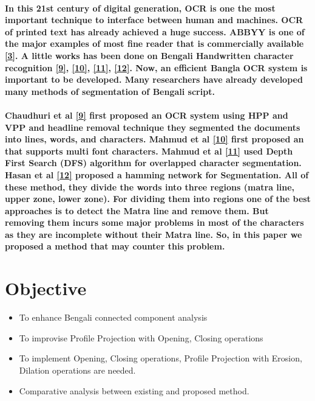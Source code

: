 \documentclass[a4paper,12pt]{article}
\begin{document}
\paragraph*{In this 21st century of digital generation, OCR is one the most important technique to interface between human and machines. OCR of printed text has already achieved a huge success. ABBYY is one of the major examples of most fine reader that is commercially available \hyperlink{3}{[3]}. A little works has been done on Bengali Handwritten character recognition \hyperlink{9}{[9]}, \hyperlink{10}{[10]}, \hyperlink{11}{[11]}, \hyperlink{12}{[12]}. Now, an efficient Bangla OCR system is important to be developed. Many researchers have already developed many methods of segmentation of Bengali script. }

\paragraph*{Chaudhuri et al \hyperlink{9}{[9]} first proposed an OCR system using HPP and VPP and headline removal technique they segmented the documents into lines, words, and characters. Mahmud et al \hyperlink{10}{[10]} first proposed an that supports multi font characters. Mahmud et al \hyperlink{11}{[11]} used Depth First Search (DFS) algorithm for overlapped character segmentation. Hasan et al \hyperlink{12}{[12]} proposed a hamming network for Segmentation. All of these method, they divide the words into three regions (matra line, upper zone, lower zone). For dividing them into regions one of the best approaches is to detect the Matra line and remove them. But removing them incurs some major problems in most of the characters as they are incomplete without their Matra line. So, in this paper we proposed a method that may counter this problem.}

\section{Objective}

\begin{itemize}

\item To enhance Bengali connected component analysis
\item To improvise Profile Projection with Opening, Closing operations
\item To implement Opening, Closing operations, Profile Projection with Erosion, Dilation operations are needed.
\item Comparative analysis between existing and proposed method.

\end{itemize}
\end{document}
